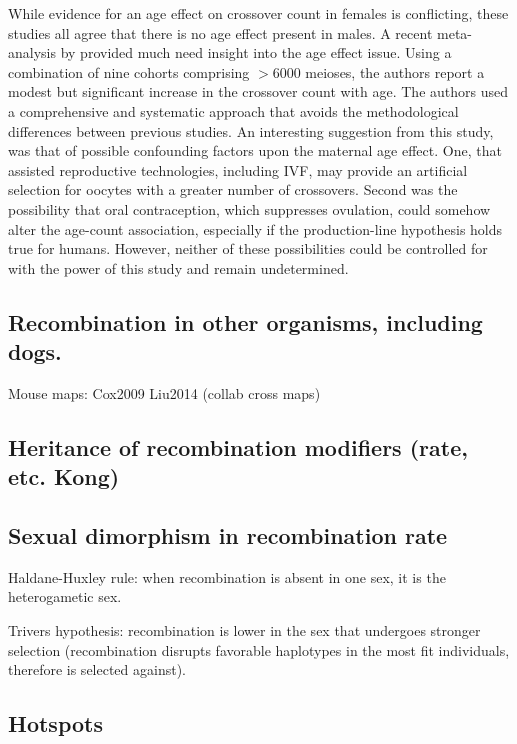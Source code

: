 While evidence for an age effect on crossover count in females is conflicting, these studies all agree that there is no age effect present in males.
A recent meta-analysis by \citet{Martin2015} provided much need insight into the age effect issue.
Using a combination of nine cohorts comprising $>$6000 meioses, the authors report a modest but significant increase in the crossover count with age.
The authors used a comprehensive and systematic approach that avoids the methodological differences between previous studies.
An interesting suggestion from this study, was that of possible confounding factors upon the maternal age effect.
One, that assisted reproductive technologies, including IVF, may provide an artificial selection for oocytes with a greater number of crossovers.
Second was the possibility that oral contraception, which suppresses ovulation, could somehow alter the age-count association, especially if the production-line hypothesis holds true for humans.
However, neither of these possibilities could be controlled for with the power of this study and remain undetermined.


\subsection{Recombination in other organisms, including dogs.}

Mouse maps:
Cox2009
Liu2014 (collab cross maps)

\subsection{Heritance of recombination modifiers (rate, etc. Kong)}
\subsection{Sexual dimorphism in recombination rate}

Haldane-Huxley rule: when recombination is absent in one sex, it is the heterogametic sex.

Trivers hypothesis: recombination is lower in the sex that undergoes stronger selection (recombination disrupts favorable haplotypes in the most fit individuals, therefore is selected against).

\subsection{Hotspots}

